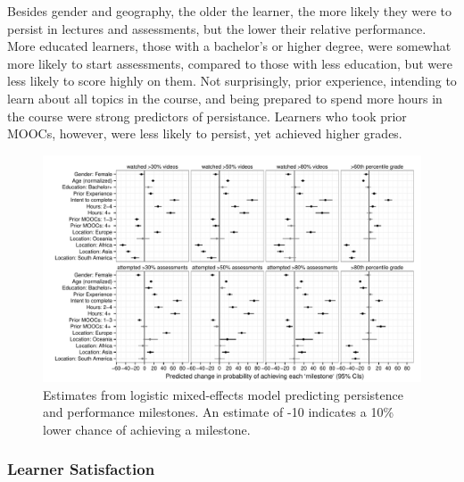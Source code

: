 \documentclass{sigchi}\usepackage[]{graphicx}\usepackage[]{color}
\makeatletter
\def\maxwidth{ %
  \ifdim\Gin@nat@width>\linewidth
    \linewidth
  \else
    \Gin@nat@width
  \fi
}
\newenvironment{knitrout}{}{} %
\makeatother
\begin{document}
Besides gender and geography, the older the learner, the more likely they were to persist in lectures and assessments, but the lower their relative performance. More educated learners, those with a bachelor's or higher degree, were somewhat more likely to start assessments, compared to those with less education, but were less likely to score highly on them. Not surprisingly, prior experience, intending to learn about all topics in the course, and being prepared to spend more hours in the course were strong predictors of persistance. Learners who took prior MOOCs, however, were less likely to persist, yet achieved higher grades.

\begin{knitrout}
\color{fgcolor}\begin{figure}[ht]

\includegraphics[width=\maxwidth]{figure/s1coefs} \caption[Estimates from logistic mixed-effects model predicting persistence and performance milestones]{Estimates from logistic mixed-effects model predicting persistence and performance milestones. An estimate of -10 indicates a 10\% lower chance of achieving a milestone.\label{fig:s1coefs}}
\end{figure}


\end{knitrout}

\subsubsection{Learner Satisfaction}
\end{document}
